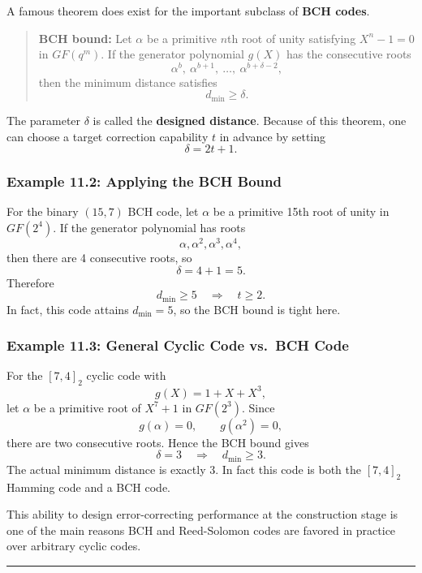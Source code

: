 \documentclass[
]{article}
\begin{document}
A famous theorem does exist for the important subclass of \textbf{BCH
codes}.

\begin{quote}
\textbf{BCH bound:} Let \(\alpha\) be a primitive \(n\)th root of unity
satisfying \(X^n-1=0\) in \(GF(q^m)\). If the generator polynomial
\(g(X)\) has the consecutive roots
\[\alpha^b,\ \alpha^{b+1},\ \dots,\ \alpha^{b+\delta-2},\] then the
minimum distance satisfies \[d_{\min} \ge \delta.\]
\end{quote}

The parameter \(\delta\) is called the \textbf{designed distance}.
Because of this theorem, one can choose a target correction capability
\(t\) in advance by setting \[\delta = 2t+1.\]

\subsubsection{Example 11.2: Applying the BCH
Bound}\label{example-11.2-applying-the-bch-bound}

For the binary \((15,7)\) BCH code, let \(\alpha\) be a primitive 15th
root of unity in \(GF(2^4)\). If the generator polynomial has roots
\[\alpha, \alpha^2, \alpha^3, \alpha^4,\] then there are 4 consecutive
roots, so \[\delta = 4+1 = 5.\] Therefore
\[d_{\min} \ge 5 \quad \Rightarrow \quad t \ge 2.\] In fact, this code
attains \(d_{\min}=5\), so the BCH bound is tight here.

\subsubsection{Example 11.3: General Cyclic Code vs.~BCH
Code}\label{example-11.3-general-cyclic-code-vs.-bch-code}

For the \([7,4]_2\) cyclic code with \[g(X)=1+X+X^3,\] let \(\alpha\) be
a primitive root of \(X^7+1\) in \(GF(2^3)\). Since
\[g(\alpha)=0, \qquad g(\alpha^2)=0,\] there are two consecutive roots.
Hence the BCH bound gives
\[\delta=3 \quad \Rightarrow \quad d_{\min} \ge 3.\] The actual minimum
distance is exactly 3. In fact this code is both the \([7,4]_2\) Hamming
code and a BCH code.

This ability to design error-correcting performance at the construction
stage is one of the main reasons BCH and Reed-Solomon codes are favored
in practice over arbitrary cyclic codes.

\begin{center}\rule{0.5\linewidth}{0.5pt}\end{center}
\end{document}
